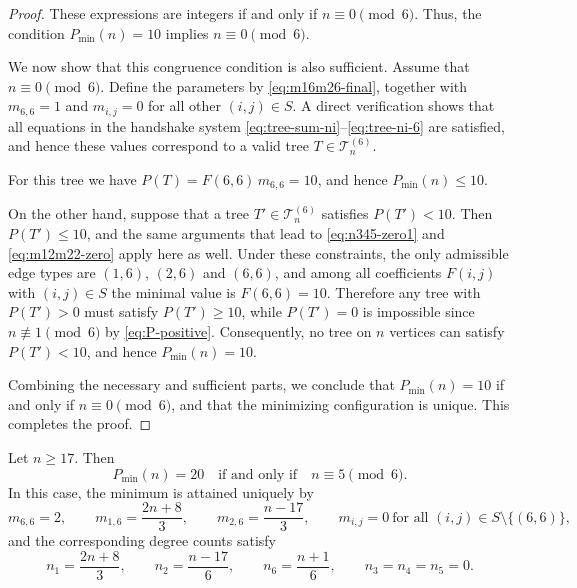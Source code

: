\documentclass[preprint,12pt]{elsarticle}
\begin{document}
\begin{proof}
These expressions are integers if and only if $n\equiv 0\pmod 6$.
Thus, the condition $P_{\min}(n)=10$ implies
$n\equiv 0\pmod 6$.

\medskip
We now show that this congruence condition is also sufficient.
Assume that $n\equiv 0\pmod 6$.
Define the parameters by \eqref{eq:m16m26-final}, together with
$m_{6,6}=1$ and $m_{i,j}=0$ for all other $(i,j)\in S$.
A direct verification shows that all equations in the handshake system
\eqref{eq:tree-sum-ni}--\eqref{eq:tree-ni-6} are satisfied, and hence these values
correspond to a valid tree $T\in\mathcal{T}_n^{(6)}$.

For this tree we have $P(T)=F(6,6)\,m_{6,6}=10$,
and hence $P_{\min}(n)\le 10$.

On the other hand, suppose that a tree $T'\in\mathcal{T}_n^{(6)}$ satisfies
$P(T')<10$.
Then $P(T') \le 10$, and the same arguments that lead to
\eqref{eq:n345-zero1} and \eqref{eq:m12m22-zero} apply here as well.
Under these constraints, the only admissible edge types are $(1,6)$, $(2,6)$ and
$(6,6)$, and among all coefficients $F(i,j)$ with $(i,j)\in S$ the minimal value is
$F(6,6)=10$.
Therefore any tree with $P(T')>0$ must satisfy $P(T')\ge 10$, while
$P(T')=0$ is impossible since $n\not\equiv 1\pmod 6$ by
\eqref{eq:P-positive}.
Consequently, no tree on $n$ vertices can satisfy $P(T')<10$, and hence $P_{\min}(n)=10$.



\medskip
Combining the necessary and sufficient parts, we conclude that
$P_{\min}(n)=10$ if and only if $n\equiv 0\pmod 6$, and that the minimizing
configuration is unique.
This completes the proof.
\end{proof}

\begin{theorem}
\label{thm:delta6-P20}
Let $n\ge 17$.
Then
\[
P_{\min}(n)=20
\quad\text{if and only if}\quad
n\equiv 5 \pmod 6.
\]
In this case, the minimum is attained uniquely by
\[
m_{6,6}=2,\qquad
m_{1,6}=\frac{2n+8}{3},\qquad
m_{2,6}=\frac{n-17}{3},
\qquad
m_{i,j}=0\ \text{for all }(i,j)\in S\setminus\{(6,6)\},
\]
and the corresponding degree counts satisfy
\[
n_1=\frac{2n+8}{3},\qquad
n_2=\frac{n-17}{6},\qquad
n_6=\frac{n+1}{6},\qquad
n_3=n_4=n_5=0.
\]
\end{theorem}
\end{document}
